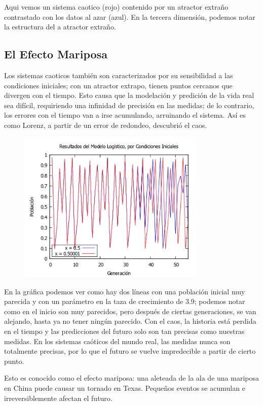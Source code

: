 \documentclass[a4paper]{article}
\begin{document}
Aqui vemos un sistema caotico (rojo) contenido por un atractor extraño contrastado con los datos al azar (azul).
En la tercera dimensión, podemos notar la estructura del a atractor extraño. 

\subsection{El Efecto Mariposa}
Los sistemas caoticos también son caracterizados por su sensibilidad a las condiciones iniciales; con un atractor extrapo, tienen puntos cercanos que divergen con el tiempo. Esto causa que la modelación y predición de la vida real sea difícil, requiriendo una infinidad de precisión en las medidas; de lo contrario, los errores con el tiempo van a irse acumulando, arruinando el sistema. Así es como Lorenz, a partir de un error de redondeo, descubrió el caos. 

\begin{figure}[!ht]
 \centering
  \includegraphics[width=0.8\textwidth]{GR05050001.png}
\end{figure}

En la gráfica podemos ver como hay dos líneas con una población inicial muy parecida y con un parámetro en la taza de crecimiento de 3.9; podemos notar como en el inicio son muy parecidos, pero después de ciertas generaciones, se van alejando, hasta ya no tener ningún parecido. Con el caos, la historia está perdida en el tiempo y las predicciones del futuro solo son tan precisas como nuestras medidas. En los sistemas caóticos del mundo real, las medidas nunca son totalmente precisas, por lo que el futuro se vuelve impredecible a partir de cierto punto.

Esto es conocido como el efecto mariposa: una aleteada de la ala de una mariposa en China puede causar un tornado en Texas. Pequeños eventos se acumulan e irreversiblemente afectan el futuro. 
\end{document}
